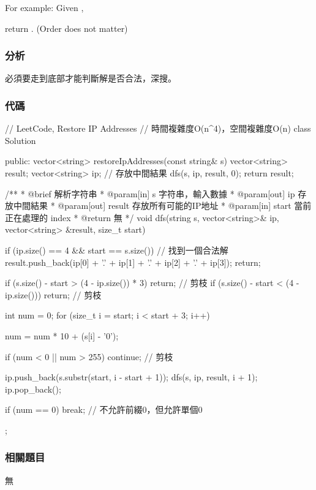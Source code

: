 For example:
Given ,

return \code{\["255.255.11.135", "255.255.111.35"\]}. (Order does not matter)


\subsubsection{分析}
必須要走到底部才能判斷解是否合法，深搜。


\subsubsection{代碼}
\begin{Code}
// LeetCode, Restore IP Addresses
// 時間複雜度O(n^4)，空間複雜度O(n)
class Solution {
public:
    vector<string> restoreIpAddresses(const string& s) {
        vector<string> result;
        vector<string> ip; // 存放中間結果
        dfs(s, ip, result, 0);
        return result;
    }

    /**
     * @brief 解析字符串
     * @param[in] s 字符串，輸入數據
     * @param[out] ip 存放中間結果
     * @param[out] result 存放所有可能的IP地址
     * @param[in] start 當前正在處理的 index
     * @return 無
     */
    void dfs(string s, vector<string>& ip, vector<string> &result,
            size_t start) {
        if (ip.size() == 4 && start == s.size()) {  // 找到一個合法解
            result.push_back(ip[0] + '.' + ip[1] + '.' + ip[2] + '.' + ip[3]);
            return;
        }

        if (s.size() - start > (4 - ip.size()) * 3)
            return;  // 剪枝
        if (s.size() - start < (4 - ip.size()))
            return;  // 剪枝

        int num = 0;
        for (size_t i = start; i < start + 3; i++) {
            num = num * 10 + (s[i] - '0');

            if (num < 0 || num > 255) continue;  // 剪枝
            
            ip.push_back(s.substr(start, i - start + 1));
            dfs(s, ip, result, i + 1);
            ip.pop_back();
            
            if (num == 0) break;  // 不允許前綴0，但允許單個0
        }
    }
};
\end{Code}


\subsubsection{相關題目}
\begindot
\item 無
\myenddot


